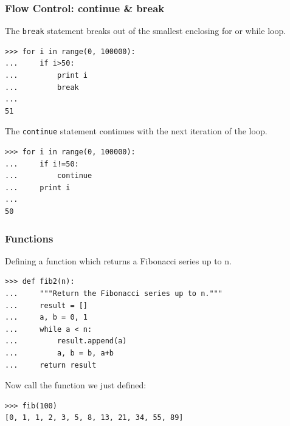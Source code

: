 \documentclass[t,10pt,compress=false,usepdftitle=false]{beamer}
\begin{document}
\begin{frame}[fragile]
    \frametitle{Flow Control: continue \& break}
The \verb#break# statement breaks out of the smallest enclosing for or while loop.
    \begin{myColorBox}{0.9}{}
\begin{verbatim}
>>> for i in range(0, 100000):
...     if i>50:
...         print i
...         break
...
51
\end{verbatim}
    \end{myColorBox}
\pause
The \verb#continue# statement continues with the next iteration of the loop.
    \begin{myColorBox}{0.9}{}
\begin{verbatim}
>>> for i in range(0, 100000):
...     if i!=50:
...         continue
...     print i
...
50
\end{verbatim}
    \end{myColorBox}
\end{frame}


\begin{frame}[fragile]
    \frametitle{Functions}
Defining a function which returns a Fibonacci series up to n.
    \begin{myColorBox}{0.9}{}
\begin{verbatim}
>>> def fib2(n):
...     """Return the Fibonacci series up to n."""
...     result = []
...     a, b = 0, 1
...     while a < n:
...         result.append(a)
...         a, b = b, a+b
...     return result
\end{verbatim}
    \end{myColorBox}
\pause
Now call the function we just defined:
    \begin{myColorBox}{0.9}{}
\begin{verbatim}
>>> fib(100)
[0, 1, 1, 2, 3, 5, 8, 13, 21, 34, 55, 89]
\end{verbatim}
    \end{myColorBox}
\end{frame}
\end{document}
